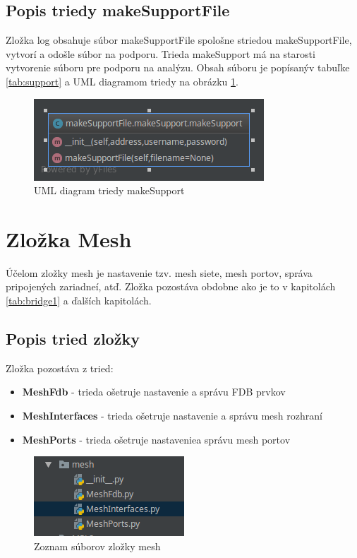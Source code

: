 \subsection{Popis triedy makeSupportFile}
Zložka log obsahuje súbor makeSupportFile spološne striedou makeSupportFile, vytvorí a odošle súbor na podporu. Trieda makeSupport má na starosti vytvorenie súboru pre podporu na analýzu. Obsah súboru je popísanýv tabuľke \ref{tab:support} a UML diagramom triedy na obrázku \ref{fig:support}.
\begin{table}[]
\caption{Tabuľka metód triedy makeSupport}
\label{tab:support}
\end{table}
\begin{figure}[H]
\centering
\includegraphics[scale=0.6]{../text/support.png}
\caption{UML diagram triedy makeSupport}
\label{fig:support}
\end{figure}
\section{Zložka Mesh}
Účelom zložky mesh je nastavenie tzv. mesh siete, mesh portov, správa pripojených zariadneí, atď. Zložka pozostáva obdobne ako je to v kapitolách \ref{tab:bridge1} a ďalších kapitolách.
\subsection{Popis tried zložky}
Zložka pozostáva z tried:
\begin{itemize}
\item \textbf{MeshFdb} - trieda ošetruje nastavenie a správu FDB prvkov
\item \textbf{MeshInterfaces} - trieda ošetruje nastavenie a správu mesh rozhraní
\item \textbf{MeshPorts} - trieda ošetruje nastaveniea správu mesh portov
\end{itemize}
\begin{figure}[H]
\centering
\includegraphics[scale=0.6]{../text/mesh.png}
\caption{Zoznam súborov zložky mesh}
\label{fig:mesh}
\end{figure}
